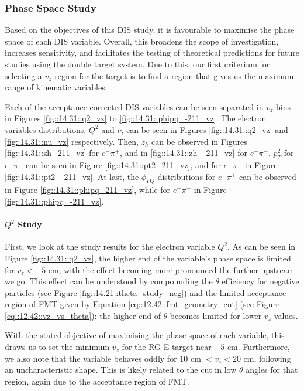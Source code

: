 \subsubsection{Phase Space Study}
\label{14.31::phase_space_study}
    Based on the objectives of this DIS study, it is favourable to maximise the phase space of each DIS variable.
    Overall, this broadens the scope of investigation, increases sensitivity, and facilitates the testing of theoretical predictions for future studies using the double target system.
    Due to this, our first criterium for selecting a $v_z$ region for the target is to find a region that gives us the maximum range of kinematic variables.

    Each of the acceptance corrected DIS variables can be seen separated in $v_z$ bins in Figures \ref{fig::14.31::q2_vz} to \ref{fig::14.31::phipq_-211_vz}.
    The electron variables distributions, $Q^2$ and $\nu$, can be seen in Figures \ref{fig::14.31::q2_vz} and \ref{fig::14.31::nu_vz} respectively.
    Then, $z_h$ can be observed in Figures \ref{fig::14.31::zh_211_vz} for $e^-\pi^+$, and in \ref{fig::14.31::zh_-211_vz} for $e^-\pi^-$.
    $p_T^2$ for $e^-\pi^+$ can be seen in Figure \ref{fig::14.31::pt2_211_vz}, and for $e^-\pi^-$ in Figure \ref{fig::14.31::pt2_-211_vz}.
    At last, the $\phi_{PQ}$ distributions for $e^-\pi^+$ can be observed in Figure \ref{fig::14.31::phipq_211_vz}, while for $e^-\pi^-$ in Figure \ref{fig::14.31::phipq_-211_vz}.


    \paragraph{$Q^2$ Study}
        First, we look at the study results for the electron variable $Q^2$.
        As can be seen in Figure \ref{fig::14.31::q2_vz}, the higher end of the variable's phase space is limited for $v_z < -5$ cm, with the effect becoming more pronounced the further upstream we go.
        This effect can be understood by compounding the $\theta$ efficiency for negative particles (see Figure \ref{fig::14.21::theta_study_neg}) and the limited acceptance region of FMT given by Equation \eqref{eq::12.42::fmt_geometry_cut} (see Figure \ref{eq::12.42::vz_vs_theta}): the higher end of $\theta$ becomes limited for lower $v_z$ values.

        With the stated objective of maximising the phase space of each variable, this draws us to set the minimum $v_z$ for the RG-E target near $-5$ cm.
        Furthermore, we also note that the variable behaves oddly for $10$ cm $< v_z < 20$ cm, following an uncharacteristic shape.
        This is likely related to the cut in low $\theta$ angles for that region, again due to the acceptance region of FMT.

